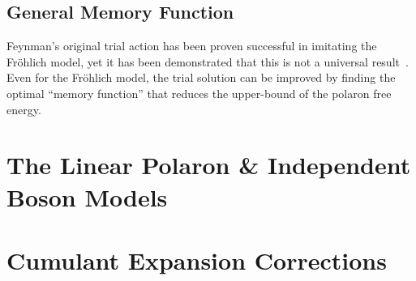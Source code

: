\subsection{General Memory Function}

Feynman's original trial action has been proven successful in imitating the Fr\"ohlich model, yet it has been demonstrated that this is not a universal result~\cite{sels_dynamic_2016, rosenfelder_best_2001}. Even for the Fr\"ohlich model, the trial solution can be improved by finding the optimal ``memory function'' that reduces the upper-bound of the polaron free energy.

\section{The Linear Polaron \& Independent Boson Models}
\label{sec:chap-fourth-third}

\section{Cumulant Expansion Corrections}
\label{sec:chap-fourth-fourth}